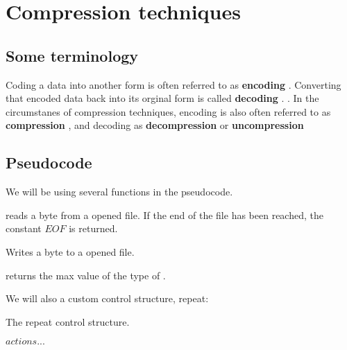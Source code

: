 \begin{comment}
  
\end{comment}

\chapter{Compression techniques}
\label{cha:digital-image}

\begin{refsection}

\section{Some terminology}
\label{sec:some-terminology}

Coding a data into another form is often referred to as
\textbf{encoding} . Converting that encoded data back
into its orginal form is called \textbf{decoding}
. . In the
circumstanes of compression techniques, encoding is also often
referred to as \textbf{compression} , and decoding as
\textbf{decompression}  or \textbf{uncompression} 


\section{Pseudocode}
\label{sec:pseudocode}

We will be using several functions in the pseudocode.

 reads a byte from a opened file. If the end of the
file has been reached, the constant $EOF$ is returned.

 Writes a byte to a opened file.

 returns the max value of the type of
.

We will also a custom control structure, repeat:

\begin{algorithm}[h]
  \caption{The repeat control structure.}
  \label{alg:repeat}
  \begin{algorithmic}[1]
      \State $actions...$  %
    \EndRepeat
  \end{algorithmic}
\end{algorithm}


\end{refsection}
